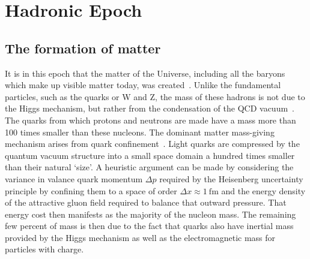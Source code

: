 \documentclass[universe,article,submit,moreauthors,pdftex,a4paper]{Definitions/mdpi}
\begin{document}
\section{Hadronic Epoch}\label{sec:Hadrons}
\subsection{The formation of matter}\label{sec:Creation}
\noindent It is in this epoch that the matter of the Universe, including all the baryons which make up visible matter today, was created~\cite{Fromerth:2002wb,Rafelski:2019twp}. Unlike the fundamental particles, such as the quarks or W and Z, the mass of these hadrons is not due to the Higgs mechanism, but rather from the condensation of the QCD vacuum~\cite{Rafelski:2015cxa,Roberts:2021xnz,Roberts:2022rxm}. The quarks from which protons and neutrons are made have a mass more than 100 times smaller than these nucleons. The dominant matter mass-giving mechanism arises from quark confinement~\cite{Hagedorn:1984hz}. Light quarks are compressed by the quantum vacuum structure into a small space domain a hundred times smaller than their natural `size'. A heuristic argument can be made by considering the variance in valance quark momentum $\Delta p$ required by the Heisenberg uncertainty principle by confining them to a space of order $\Delta x\approx1\ \mathrm{fm}$ and the energy density of the attractive gluon field required to balance that outward pressure. That energy cost then manifests as the majority of the nucleon mass. The remaining few percent of mass is then due to the fact that quarks also have inertial mass provided by the Higgs mechanism as well as the electromagnetic mass for particles with charge.
\end{document}
